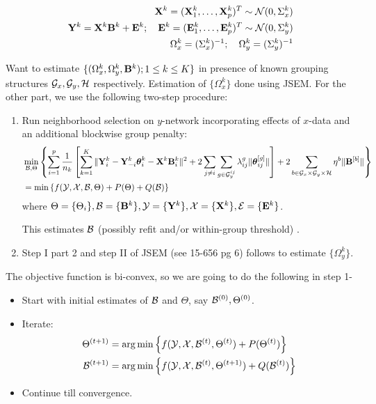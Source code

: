 \documentclass[fleqn,11pt]{article}
\DeclareMathOperator*{\argmin}{arg\,min}
\numberwithin{equation}{section}
\begin{document}
\begin{eqnarray}
{\mathbf{X}}^k = ({\mathbf{X}}^k_1, \ldots, {\mathbf{X}}^k_p)^T \sim {\cal{N}} (0, \Sigma^k_x)\\
{\mathbf{Y}}^k = {\mathbf{X}}^k {\mathbf{B}}^k + {\mathbf{E}}^k; \quad {\mathbf{E}}^k = ({\mathbf{E}}^k_1, \ldots, {\mathbf{E}}^k_p)^T \sim {\cal{N}} (0, \Sigma^k_y)\\
\Omega^k_x = (\Sigma^k_x)^{-1}; \quad \Omega^k_y = (\Sigma^k_y)^{-1}
\end{eqnarray}

Want to estimate $\{ (\Omega^k_x, \Omega^k_y, {\mathbf{B}}^k); 1 \leq k \leq K \}$ in presence of known grouping structures ${\cal{G}}_x, {\cal{G}}_y, {\cal{H}}$ respectively. Estimation of $\{ \Omega_x^k \}$ done using JSEM. For the other part, we use the following two-step procedure:

\begin{enumerate}
\item Run neighborhood selection on $y$-network incorporating effects of $x$-data and an additional blockwise group penalty:
%
\begin{align}
& \min_{{\cal{B}}, \Theta} \left\{ \sum_{i=1}^p  \frac{1}{n_k} \left[ \sum_{k=1}^K \| {\mathbf{Y}}^k_i - {\mathbf{Y}}_{-i}^k {\boldsymbol{\theta}}_i^k - {\mathbf{X}}^k {\mathbf{B}}_i^k \|^2 + 2 \sum_{j \neq i} \sum_{g \in {\cal{G}}_y^{ij}} \lambda_{ij}^g \| {\boldsymbol{\theta}}_{ij}^{[g]} \| \right] + 2 \sum_{b \in {\cal{G}}_x \times {\cal{G}}_y \times {\cal{H}}} \eta^b \| {\mathbf{B}}^{[b]} \| \right\}\\
&= \min \left\{ f ( {\cal{Y}}, {\cal{X}}, {\cal{B}}, \Theta) + P (\Theta) + Q ({\cal{B}}) \right\} 
\end{align}
%
where $\Theta = \{ \Theta_i \}, {\cal{B}} = \{ {\mathbf{B}}^k \}, {\cal{Y}} = \{ {\mathbf{Y}}^k \}, {\cal{X}} = \{ {\mathbf{X}}^k \}, {\cal{E}} = \{ {\mathbf{E}}^k \}$.

This estimates ${\cal{B}}$ { \colrbf (possibly refit and/or within-group threshold) }.

\item Step I part 2 and step II of JSEM (see 15-656 pg 6) follows to estimate $\{ \Omega_y^k \}$.
\end{enumerate}

The objective function is bi-convex, so we are going to do the following in step 1-

\begin{itemize}
\item Start with initial estimates of ${\cal{B}}$ and $\Theta$, say ${\cal{B}}^{(0)}, \Theta^{(0)}$.
\item Iterate:
%
\begin{align}
\Theta^{(t+1)} &= \argmin \left\{ f ( \cY, \cX, \cB^{(t)}, \Theta^{(t)}) + P (\Theta^{(t)}) \right\}\\
\cB^{(t+1)} &= \argmin \left\{ f ( \cY, \cX, \cB^{(t)}, \Theta^{(t+1)}) + Q (\cB^{(t)}) \right\}
\end{align}
\item Continue till convergence.
\end{itemize}
%
\end{document}
